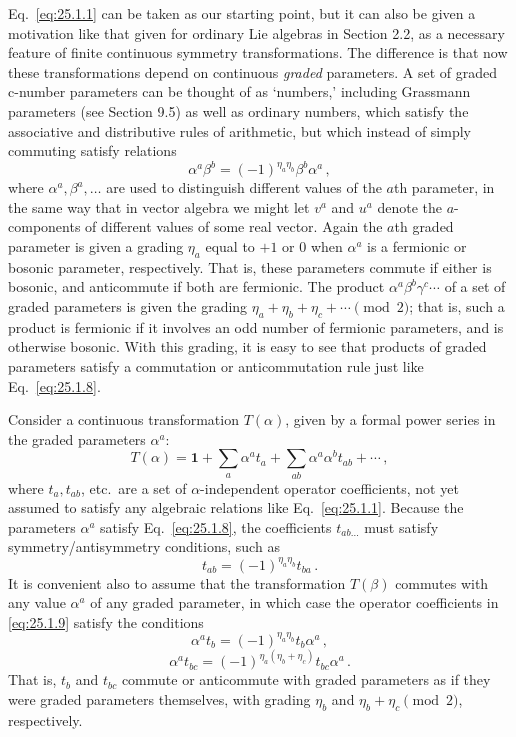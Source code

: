 Eq.~\eqref{eq:25.1.1} can be taken as our starting point, but it can also be
given a motivation like that given for ordinary Lie algebras in Section 2.2,
as a necessary feature of finite continuous symmetry transformations. The
difference is that now these transformations depend on continuous
\emph{graded} parameters. A set of graded c-number parameters can be thought
of as `numbers,' including Grassmann parameters (see Section 9.5) as well as
ordinary numbers, which satisfy the associative and distributive rules of
arithmetic, but which instead of simply commuting satisfy relations
\begin{equation}
  \alpha^a\beta^b=(-1)^{\eta_a\eta_b}\beta^b\alpha^a\,,
  \tag{25.1.8}\label{eq:25.1.8}
\end{equation}
where $\alpha^a,\beta^a,\ldots$ are used to distinguish different values of
the $a$th parameter, in the same way that in vector algebra we might let
$v^a$ and $u^a$ denote the $a$-components of different values of some real
vector. Again the $a$th graded parameter is given a grading $\eta_a$ equal to
$+1$ or 0 when $\alpha^a$ is a fermionic or bosonic parameter, respectively.
That is, these parameters commute if either is bosonic, and anticommute if
both are fermionic. The product $\alpha^a\beta^b\gamma^c\cdots$ of a set of
graded parameters is given the grading
$\eta_a+\eta_b+\eta_c+\cdots\pmod 2$; that is, such a product is fermionic if
it involves an odd number of fermionic parameters, and is otherwise bosonic.
With this grading, it is easy to see that products of graded parameters
satisfy a commutation or anticommutation rule just like
Eq.~\eqref{eq:25.1.8}.

Consider a continuous transformation $T(\alpha)$, given by a formal power
series in the graded parameters $\alpha^a$:
\begin{equation}
  T(\alpha)=\mathbf{1}+\sum_a\alpha^at_a
  +\sum_{ab}\alpha^a\alpha^bt_{ab}+\cdots\,,
  \tag{25.1.9}\label{eq:25.1.9}
\end{equation}
where $t_a,t_{ab}$, etc.\ are a set of $\alpha$-independent operator
coefficients, not yet assumed to satisfy any algebraic relations like
Eq.~\eqref{eq:25.1.1}. Because the parameters $\alpha^a$ satisfy
Eq.~\eqref{eq:25.1.8}, the coefficients $t_{ab\ldots}$ must satisfy
symmetry/antisymmetry conditions, such as
\begin{equation}
  t_{ab}=(-1)^{\eta_a\eta_b}t_{ba}\,.
  \tag{25.1.10}\label{eq:25.1.10}
\end{equation}
It is convenient also to assume that the transformation $T(\beta)$ commutes
with any value $\alpha^a$ of any graded parameter, in which case the operator
coefficients in \eqref{eq:25.1.9} satisfy the conditions
\begin{equation}
  \alpha^at_b=(-1)^{\eta_a\eta_b}t_b\alpha^a\,,
  \tag{25.1.11}\label{eq:25.1.11}
\end{equation}
\begin{equation}
  \alpha^at_{bc}=(-1)^{\eta_a(\eta_b+\eta_c)}t_{bc}\alpha^a\,.
  \tag{25.1.12}\label{eq:25.1.12}
\end{equation}
That is, $t_b$ and $t_{bc}$ commute or anticommute with graded parameters as
if they were graded parameters themselves, with grading $\eta_b$ and
$\eta_b+\eta_c\pmod 2$, respectively.

